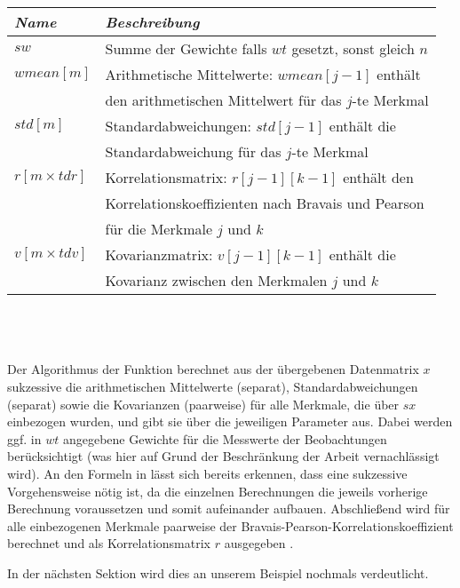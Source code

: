 \newpage

\\
	
\noindent \begin{tabular}[ht]{|l|l|}
  	\hline
  	\textit{Name} & \textit{Beschreibung}\\
  	\hline \hline
	$sw$ & Summe der Gewichte falls $wt$ gesetzt, sonst gleich $n$\\ \hline
  	$wmean[m]$ & Arithmetische Mittelwerte: $wmean[j - 1]$ enthält\\
  	& den arithmetischen Mittelwert für das $j$-te Merkmal\\ \hline
  	$std[m]$ & Standardabweichungen: $std[j - 1]$ enthält die\\
  	& Standardabweichung für das $j$-te Merkmal\\ \hline
  	$r[m \times tdr]$ & Korrelationsmatrix: $r[j - 1][k - 1]$ enthält den\\
	& Korrelationskoeffizienten nach Bravais und Pearson\\
	& für die Merkmale $j$ und $k$\\ \hline
	$v[m \times tdv]$ & Kovarianzmatrix: $v[j - 1][k - 1]$ enthält die\\
	& Kovarianz zwischen den Merkmalen $j$ und $k$\\
  	\hline
\end{tabular}\\\\

\\

\noindent Der Algorithmus der Funktion berechnet aus der übergebenen Datenmatrix $x$ sukzessive die arithmetischen Mittelwerte (separat), Standardabweichungen (separat) sowie die Kovarianzen (paarweise) für alle Merkmale, die über $sx$ einbezogen wurden, und gibt sie über die jeweiligen Parameter aus. Dabei werden ggf. in $wt$ angegebene Gewichte für die Messwerte der Beobachtungen berücksichtigt (was hier auf Grund der Beschränkung der Arbeit vernachlässigt wird). An den Formeln in  lässt sich bereits erkennen, dass eine sukzessive Vorgehensweise nötig ist, da die einzelnen Berechnungen die jeweils vorherige Berechnung voraussetzen und somit aufeinander aufbauen. Abschließend wird für alle einbezogenen Merkmale paarweise der Bravais-Pearson-Korrelationskoeffizient berechnet und als Korrelationsmatrix $r$ ausgegeben \cite[S. 1]{nag:g02bxc}.

In der nächsten Sektion wird dies an unserem Beispiel nochmals verdeutlicht.

